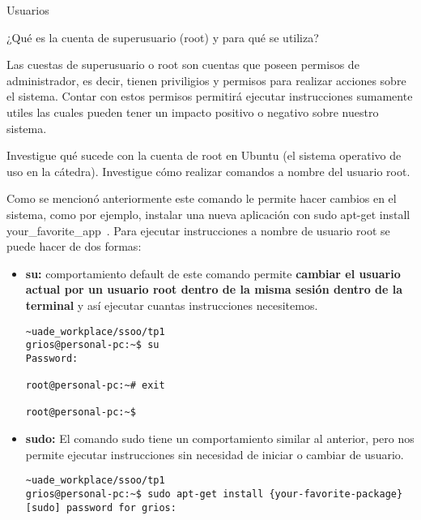 \begin{section}{Usuarios}

\begin{quoting}
¿Qué es la cuenta de superusuario (root) y para qué se utiliza?
\end{quoting}

Las cuestas de superusuario o root son cuentas que poseen permisos de administrador, es decir, tienen priviligios y permisos para realizar acciones sobre el sistema. Contar con estos permisos permitirá ejecutar instrucciones sumamente utiles las cuales pueden tener un impacto positivo o negativo sobre nuestro sistema.

\hfill

\begin{quoting}
Investigue qué sucede con la cuenta de root en Ubuntu (el sistema operativo de uso en la cátedra). Investigue cómo realizar comandos a nombre del usuario root.
\end{quoting}

Como se mencionó anteriormente este comando le permite hacer cambios en el sistema, como por ejemplo, instalar una nueva aplicación con \guillemotleft sudo apt-get install your\_favorite\_app\ \guillemotright. Para ejecutar instrucciones a nombre de usuario root se puede hacer de dos formas:

\begin{itemize}

\item \textbf{su:}
comportamiento default de este comando permite \textbf{cambiar el usuario actual por un usuario root dentro de la misma sesión dentro de la terminal} y así ejecutar cuantas instrucciones necesitemos.

\begin{lstlisting}[style=Ubuntu]
~uade_workplace/ssoo/tp1
grios@personal-pc:~$ su
Password: 

root@personal-pc:~# exit

root@personal-pc:~$ 
\end{lstlisting}

\item \textbf{sudo:}
El comando sudo tiene un comportamiento similar al anterior, pero nos permite ejecutar instrucciones sin necesidad de iniciar o cambiar de usuario.

\begin{lstlisting}[style=Ubuntu]
~uade_workplace/ssoo/tp1
grios@personal-pc:~$ sudo apt-get install {your-favorite-package}        
[sudo] password for grios: 
\end{lstlisting}


\end{itemize}
\end{section}
